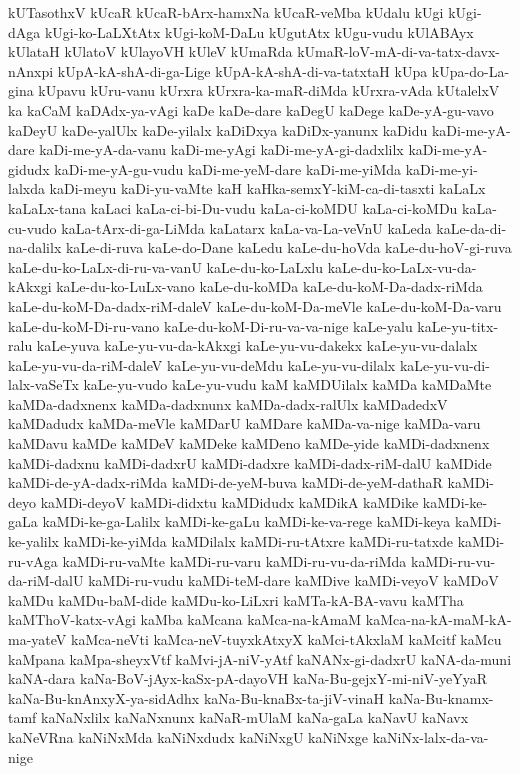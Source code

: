{kUTasothxV
kUcaR
kUcaR-bArx-hamxNa
kUcaR-veMba
kUdalu
kUgi
kUgi-dAga
kUgi-ko-LaLXtAtx
kUgi-koM-DaLu
kUgutAtx
kUgu-vudu
kUlABAyx
kUlataH
kUlatoV
kUlayoVH
kUleV
kUmaRda
kUmaR-loV-mA-di-va-tatx-davx-nAnxpi
kUpA-kA-shA-di-ga-Lige
kUpA-kA-shA-di-va-tatxtaH
kUpa
kUpa-do-La-gina
kUpavu
kUru-vanu
kUrxra
kUrxra-ka-maR-diMda
kUrxra-vAda
kUtalelxV
ka
kaCaM
kaDAdx-ya-vAgi
kaDe
kaDe-dare
kaDegU
kaDege
kaDe-yA-gu-vavo
kaDeyU
kaDe-yalUlx
kaDe-yilalx
kaDiDxya
kaDiDx-yanunx
kaDidu
kaDi-me-yA-dare
kaDi-me-yA-da-vanu
kaDi-me-yAgi
kaDi-me-yA-gi-dadxlilx
kaDi-me-yA-gidudx
kaDi-me-yA-gu-vudu
kaDi-me-yeM-dare
kaDi-me-yiMda
kaDi-me-yi-lalxda
kaDi-meyu
kaDi-yu-vaMte
kaH
kaHka-semxY-kiM-ca-di-tasxti
kaLaLx
kaLaLx-tana
kaLaci
kaLa-ci-bi-Du-vudu
kaLa-ci-koMDU
kaLa-ci-koMDu
kaLa-cu-vudo
kaLa-tArx-di-ga-LiMda
kaLatarx
kaLa-va-La-veVnU
kaLeda
kaLe-da-di-na-dalilx
kaLe-di-ruva
kaLe-do-Dane
kaLedu
kaLe-du-hoVda
kaLe-du-hoV-gi-ruva
kaLe-du-ko-LaLx-di-ru-va-vanU
kaLe-du-ko-LaLxlu
kaLe-du-ko-LaLx-vu-da-kAkxgi
kaLe-du-ko-LuLx-vano
kaLe-du-koMDa
kaLe-du-koM-Da-dadx-riMda
kaLe-du-koM-Da-dadx-riM-daleV
kaLe-du-koM-Da-meVle
kaLe-du-koM-Da-varu
kaLe-du-koM-Di-ru-vano
kaLe-du-koM-Di-ru-va-va-nige
kaLe-yalu
kaLe-yu-titx-ralu
kaLe-yuva
kaLe-yu-vu-da-kAkxgi
kaLe-yu-vu-dakekx
kaLe-yu-vu-dalalx
kaLe-yu-vu-da-riM-daleV
kaLe-yu-vu-deMdu
kaLe-yu-vu-dilalx
kaLe-yu-vu-di-lalx-vaSeTx
kaLe-yu-vudo
kaLe-yu-vudu
kaM
kaMDUilalx
kaMDa
kaMDaMte
kaMDa-dadxnenx
kaMDa-dadxnunx
kaMDa-dadx-ralUlx
kaMDadedxV
kaMDadudx
kaMDa-meVle
kaMDarU
kaMDare
kaMDa-va-nige
kaMDa-varu
kaMDavu
kaMDe
kaMDeV
kaMDeke
kaMDeno
kaMDe-yide
kaMDi-dadxnenx
kaMDi-dadxnu
kaMDi-dadxrU
kaMDi-dadxre
kaMDi-dadx-riM-dalU
kaMDide
kaMDi-de-yA-dadx-riMda
kaMDi-de-yeM-buva
kaMDi-de-yeM-dathaR
kaMDi-deyo
kaMDi-deyoV
kaMDi-didxtu
kaMDidudx
kaMDikA
kaMDike
kaMDi-ke-gaLa
kaMDi-ke-ga-Lalilx
kaMDi-ke-gaLu
kaMDi-ke-va-rege
kaMDi-keya
kaMDi-ke-yalilx
kaMDi-ke-yiMda
kaMDilalx
kaMDi-ru-tAtxre
kaMDi-ru-tatxde
kaMDi-ru-vAga
kaMDi-ru-vaMte
kaMDi-ru-varu
kaMDi-ru-vu-da-riMda
kaMDi-ru-vu-da-riM-dalU
kaMDi-ru-vudu
kaMDi-teM-dare
kaMDive
kaMDi-veyoV
kaMDoV
kaMDu
kaMDu-baM-dide
kaMDu-ko-LiLxri
kaMTa-kA-BA-vavu
kaMTha
kaMThoV-katx-vAgi
kaMba
kaMcana
kaMca-na-kAmaM
kaMca-na-kA-maM-kA-ma-yateV
kaMca-neVti
kaMca-neV-tuyxkAtxyX
kaMci-tAkxlaM
kaMcitf
kaMcu
kaMpana
kaMpa-sheyxVtf
kaMvi-jA-niV-yAtf
kaNANx-gi-dadxrU
kaNA-da-muni
kaNA-dara
kaNa-BoV-jAyx-kaSx-pA-dayoVH
kaNa-Bu-gejxY-mi-niV-yeYyaR
kaNa-Bu-knAnxyX-ya-sidAdhx
kaNa-Bu-knaBx-ta-jiV-vinaH
kaNa-Bu-knamx-tamf
kaNaNxlilx
kaNaNxnunx
kaNaR-mUlaM
kaNa-gaLa
kaNavU
kaNavx
kaNeVRna
kaNiNxMda
kaNiNxdudx
kaNiNxgU
kaNiNxge
kaNiNx-lalx-da-va-nige
}
